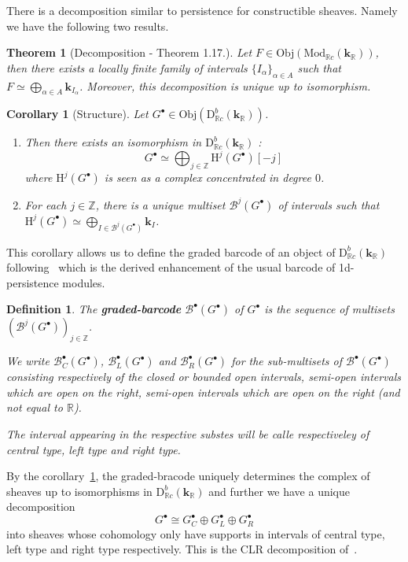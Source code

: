 \documentclass[a4paper, english, 11pt]{article}
\newcommand{\kk}[0]{\textbf{k}}
\newcommand{\Mod}[0]{\text{Mod}}
\newcommand{\0}{\vec{0}}
\newcommand{\R}[0]{\mathbb{R}}
\newcommand{\Z}[0]{\mathbb{Z}}
\newcommand{\B}[0]{\mathcal{B}}
\newcommand{\D}[0]{\text{D}}
\newcommand{\Obj}[0]{\text{Obj}}
\newcommand{\Ho}[0]{\text{H}}
\newtheorem{cor}[prop]{Corollary}
\newtheorem{defi}[prop]{Definition}
\newtheorem{thm}[prop]{Theorem}
\begin{document}
There is a decomposition similar to persistence for constructible sheaves. Namely we have the following two results.
\begin{thm}[Decomposition - \cite{KS18} Theorem 1.17.]\label{T:KSdecomposition}
Let $F \in \Obj(\Mod_{\R c}(\kk_\R))$, then there exists a locally finite family of intervals $\{I_\alpha\}_{\alpha \in A}$ such that $F \simeq \bigoplus_{\alpha \in A} \kk_{I_\alpha}$. Moreover, this decomposition is unique up to isomorphism.
\end{thm}
\begin{cor}[Structure]\label{T:KSstructure}
Let $G^\bullet\in \Obj(\D^b_{\R c}(\kk_\R))$. 
\begin{enumerate} \item Then there exists an isomorphism in $\D^b_{\R c}(\kk_\R)$ : $$G^\bullet \simeq \bigoplus_{j\in\Z} \Ho^j(G^\bullet)[-j]$$
where $\Ho^j(G^\bullet)$ is seen as a complex concentrated in degree $0$.
\item For each $j\in \Z$, there is a unique multiset $\B^j(G^\bullet) $ of intervals such that  $\Ho^j(G^\bullet)\simeq \bigoplus_{I \in \B^j(G^\bullet)} \kk_{I}$. 
\end{enumerate}\end{cor}
This corollary allows us to define the graded barcode of an object of $\D^b_{\R c}(\kk_\R)$ following~\cite{Berk18} which is the  derived enhancement of the usual barcode of 1d-persistence modules.
\begin{defi}\label{D:gradedbarcode}
 The \textbf{graded-barcode} $\B^\bullet(G^\bullet)$ of $G^\bullet$ is the sequence of multisets $(\B^j(G^\bullet))_{j\in \Z}$.
 
We write $\B_C^\bullet(G^\bullet)$, $\B_L^\bullet(G^\bullet)$ and $\B_R^\bullet(G^\bullet)$ for the  sub-multisets of $\B^\bullet(G^\bullet)$ consisting respectively of the closed or bounded open intervals, semi-open intervals which are open on the right,  semi-open intervals which are open on the right (and not equal to $\R$). 

The interval appearing in the respective substes will be calle respectiveley of central type, left type and right type.
 \end{defi}
By the corollary~\ref{T:KSstructure}, the graded-bracode uniquely determines the complex of sheaves up to isomorphisms in $\D^b_{\R c}(\kk_\R)$ and further we have a unique decomposition $$G^\bullet \cong G_C^\bullet \oplus G_L^\bullet \oplus G_R^\bullet $$ into sheaves whose cohomology only have supports    
in intervals of central type, left type and right type respectively. This is the CLR decomposition of~\cite{Berk18}.
\end{document}

